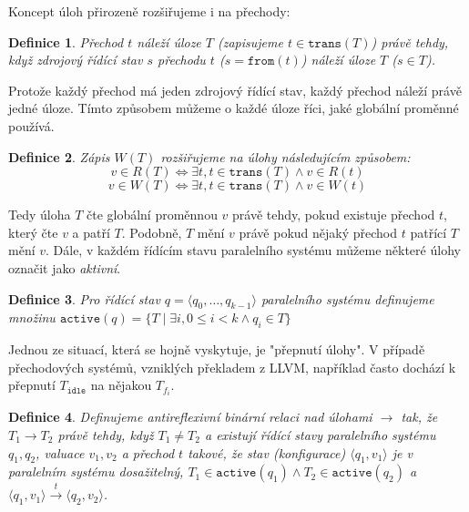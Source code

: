 \documentclass[10pt,a4paper,notitlepage]{report}
\newtheorem{definition}{Definice}
\newcommand{\tuple}[1]{\langle #1 \rangle}
\newcommand{\suchthat}{\mid}
\begin{document}
Koncept úloh přirozeně rozšiřujeme i na přechody:
\begin{definition}
Přechod $t$ náleží úloze $T$ (zapisujeme $t \in \texttt{trans}(T)$) právě tehdy, když zdrojový řídící stav $s$ přechodu $t$ ($s = \texttt{from}(t)$) náleží úloze $T$ ($s \in T$).
\end{definition}
Protože každý přechod má jeden zdrojový řídící stav, každý přechod náleží právě jedné úloze. Tímto způsobem můžeme o každé úloze říci, jaké globální proměnné používá.

\begin{definition}
Zápis $W(T)$ rozšiřujeme na úlohy následujícím způsobem:
\begin{equation*}
v \in R(T) \Leftrightarrow \exists t, t \in \texttt{trans}(T) \land v \in R(t)
\end{equation*}
\begin{equation*}
v \in W(T) \Leftrightarrow \exists t, t \in \texttt{trans}(T) \land v \in W(t)
\end{equation*}
\end{definition}
Tedy úloha $T$ čte globální proměnnou $v$ právě tehdy, pokud existuje přechod $t$, který čte $v$ a patří $T$. Podobně, $T$ mění $v$ právě pokud nějaký přechod $t$ patřící $T$ mění $v$.
Dále, v každém řídícím stavu paralelního systému můžeme některé úlohy označit jako \textit{aktivní}.
\begin{definition}
Pro řídící stav $q = \tuple{q_0, \ldots, q_{k-1}}$ paralelního systému definujeme množinu $\texttt{active}(q) = \{ T \suchthat \exists i, 0 \leq i < k \land q_i \in T \}$
\end{definition}

Jednou ze situací, která se hojně vyskytuje, je "přepnutí úlohy". V případě přechodových systémů, vzniklých překladem z LLVM, například často dochází k přepnutí $T_\texttt{idle}$ na nějakou $T_{f_i}$. 

\newcommand{\switchto}{\rightarrow}
\newcommand{\canswitchto}{\dashrightarrow}

\begin{definition}
Definujeme antireflexivní binární relaci nad úlohami $\switchto$ tak, že $T_1 \switchto T_2$ právě tehdy, když $T_1 \neq T_2$ a existují řídící stavy paralelního systému $q_1, q_2$, valuace $v_1, v_2$ a přechod $t$ takové, že stav (konfigurace) $\tuple{q_1, v_1}$ je v paralelním systému dosažitelný, $T_1 \in \texttt{active}(q_1) \land T_2 \in \texttt{active}(q_2)$ a $\tuple{q_1, v_1} \xrightarrow{t} \tuple{q_2, v_2}$.
\end{definition}
\end{document}
